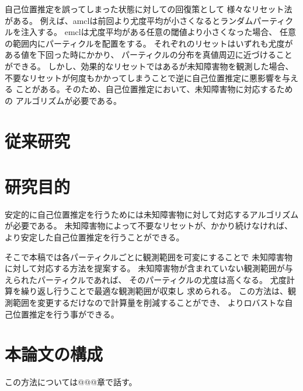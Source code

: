 自己位置推定を誤ってしまった状態に対しての回復策として
様々なリセット法がある。
例えば、amclは前回より尤度平均が小さくなるとランダムパーティクルを注入する。
emclは尤度平均がある任意の閾値より小さくなった場合、
任意の範囲内にパーティクルを配置をする\cite{ueda2004iros}。
それぞれのリセットはいずれも尤度がある値を下回った時にかかり、
パーティクルの分布を真値周辺に近づけることができる。
しかし、効果的なリセットではあるが未知障害物を観測した場合、
不要なリセットが何度もかかってしまうことで逆に自己位置推定に悪影響を与える
ことがある。そのため、自己位置推定において、未知障害物に対応するための
アルゴリズムが必要である。



\section{従来研究}




\section{研究目的}

安定的に自己位置推定を行うためには未知障害物に対して対応するアルゴリズムが必要である。
未知障害物によって不要なリセットが、かかり続けなければ、
より安定した自己位置推定を行うことができる。

そこで本稿では各パーティクルごとに観測範囲を可変にすることで
未知障害物に対して対応する方法を提案する。
未知障害物が含まれていない観測範囲が与えられたパーティクルであれば、
そのパーティクルの尤度は高くなる。
尤度計算を繰り返し行うことで最適な観測範囲が収束し
求められる。
この方法は、観測範囲を変更するだけなので計算量を削減することができ、
よりロバストな自己位置推定を行う事ができる。


\section{本論文の構成}
この方法については@@@章で話す。
